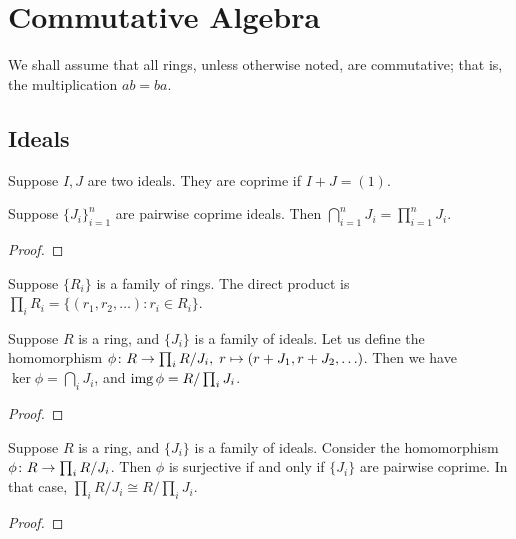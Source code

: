 \chapter{Commutative Algebra}\label{ch:comm-alg}

\begin{remark}
    We shall assume that all rings,
    unless otherwise noted, are commutative;
    that is, the multiplication \(ab = ba\).
\end{remark}

\section{Ideals}

\begin{definition}
    Suppose \(I,J\) are two ideals.
    They are coprime if \(I+J = (1)\).
\end{definition}
\begin{theorem}
    Suppose \({\{J_i\}}_{i=1}^n\) are pairwise coprime ideals.
    Then \(\bigcap_{i=1}^n J_i = \prod_{i=1}^n J_i\).
\end{theorem}
\begin{proof}
    
\end{proof}

\begin{definition}
    Suppose \(\{R_i\}\) is a family of rings.
    The direct product is \(\prod_i R_i = \{(r_1,r_2,\hdots) : r_i \in R_i\}\).
\end{definition}
\begin{lemma}
    Suppose \(R\) is a ring, and \(\{J_i\}\) is a family of ideals.
    Let us define the homomorphism \(\phi\colon R\to\prod_i R/J_i,\;r\mapsto(r+J_1,r+J_2,\hdots)\).
    Then we have \(\ker\phi = \bigcap_i J_i\),
    and \(\operatorname{img}\phi = R/\prod_i J_i\).
\end{lemma}
\begin{proof}
    
\end{proof}
\begin{theorem}
    Suppose \(R\) is a ring, and \(\{J_i\}\) is a family of ideals.
    Consider the homomorphism \(\phi\colon R\to\prod_i R/J_i\).
    Then \(\phi\) is surjective if and only if \(\{J_i\}\) are pairwise coprime.
    In that case, \(\prod_i R/J_i \cong R/\prod_i J_i\).
\end{theorem}
\begin{proof}
    
\end{proof}

